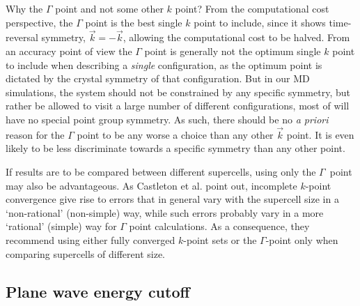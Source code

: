 \documentclass[11pt,bibliography=totoc,index=totoc]{scrbook}   %
\newcommand{\comment}[1]{\hl{#1}}
\begin{document}
Why the $\Gamma$ point and not some other $k$ point?
From the computational cost perspective, the $\Gamma$ point is the best single $k$ point to include, since it shows time-reversal symmetry, 
$\vec{k}=-\vec{k}$, allowing the computational cost to be halved. 
From an accuracy point of view the $\Gamma$ point is generally not the optimum single $k$ point to include when describing a \emph{single} configuration, as the optimum point is dictated by the crystal symmetry of that configuration\cite{Baldereschi:1973}. 
But in our MD simulations, the system should not be constrained by any specific symmetry, but rather be allowed to visit a large number of different configurations, most of will have no special point group symmetry. 
As such, there should be no \textit{a priori} reason for the $\Gamma$ point to be any worse a choice than any other $\vec{k}$ point. 
It is even likely to be less discriminate towards a specific symmetry than any other point.

If results are to be compared between different supercells, using only the $\Gamma$~point may also be advantageous.
As Castleton et al. point out\cite{Castleton:2009}, incomplete $k$-point convergence give rise to errors that in general vary with the supercell size in a `non-rational' (non-simple) way, while such errors probably vary in a more `rational' (simple) way for $\Gamma$ point calculations. 
As a consequence, they recommend using either fully converged $k$-point sets or the $\Gamma$-point only when comparing supercells of different size.











%
\subsection{Plane wave energy cutoff}\label{sec:parameters:e}
%
\end{document}
